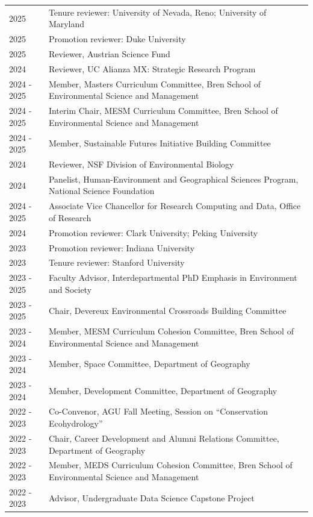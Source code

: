 \begin{longtable}{l p{5.5in}}
2025 & Tenure reviewer: University of Nevada, Reno; University of Maryland \\
2025 & Promotion reviewer: Duke University \\
2025 & Reviewer, Austrian Science Fund \\
2024 & Reviewer, UC Alianza MX: Strategic Research Program \\
2024 - 2025 & Member, Masters Curriculum Committee, Bren School of Environmental Science and Management \\
2024 - 2025 & Interim Chair, MESM Curriculum Committee, Bren School of Environmental Science and Management \\
2024 - 2025 & Member, Sustainable Futures Initiative Building Committee \\
2024 & Reviewer, NSF Division of Environmental Biology \\
2024 & Panelist, Human-Environment and Geographical Sciences Program, National Science Foundation \\
2024 - 2025 & Associate Vice Chancellor for Research Computing and Data, Office of Research \\
2024 & Promotion reviewer: Clark University; Peking University \\
2023 & Promotion reviewer: Indiana University \\
2023 & Tenure reviewer: Stanford University \\
2023 - 2025 & Faculty Advisor, Interdepartmental PhD Emphasis in Environment and Society \\
2023 - 2025 & Chair, Devereux Environmental Crossroads Building Committee \\
2023 - 2024 & Member, MESM Curriculum Cohesion Committee, Bren School of Environmental Science and Management \\
2023 - 2024 & Member, Space Committee, Department of Geography \\
2023 - 2024 & Member, Development Committee, Department of Geography \\
2022 - 2023 & Co-Convenor, AGU Fall Meeting, Session on ``Conservation Ecohydrology'' \\
2022 - 2023 & Chair, Career Development and Alumni Relations Committee, Department of Geography \\
2022 - 2023 & Member, MEDS Curriculum Cohesion Committee, Bren School of Environmental Science and Management \\
2022 - 2023 & Advisor, Undergraduate Data Science Capstone Project \\

\end{longtable}
